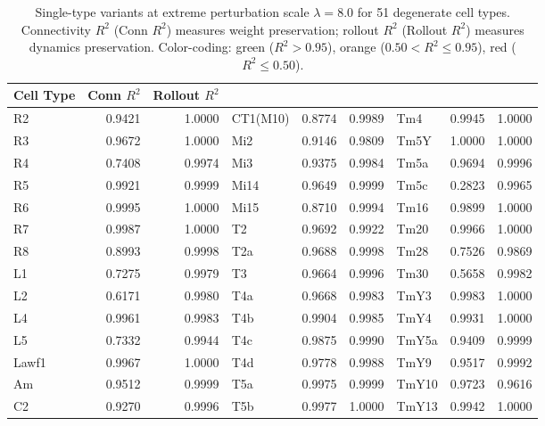 \documentclass[11pt,a4paper]{article}
\begin{document}
\begin{table}[h!]
\centering
\footnotesize
\begin{tabular}{lrr@{\quad}lrr@{\quad}lrr}
\toprule
Cell Type & Conn $R^2$ & Rollout $R^2$ & &  &  &  &  &  \\
\midrule
R2 & \cellcolor{corange} 0.9421 & 1.0000 & CT1(M10) & \cellcolor{corange} 0.8774 & 0.9989 & Tm4 & \cellcolor{cgreen} 0.9945 & 1.0000 \\
R3 & \cellcolor{cgreen} 0.9672 & 1.0000 & Mi2 & \cellcolor{corange} 0.9146 & 0.9809 & Tm5Y & \cellcolor{cgreen} 1.0000 & 1.0000 \\
R4 & \cellcolor{corange} 0.7408 & 0.9974 & Mi3 & \cellcolor{corange} 0.9375 & 0.9984 & Tm5a & \cellcolor{cgreen} 0.9694 & 0.9996 \\
R5 & \cellcolor{cgreen} 0.9921 & 0.9999 & Mi14 & \cellcolor{cgreen} 0.9649 & 0.9999 & Tm5c & \cellcolor{cred} 0.2823 & 0.9965 \\
R6 & \cellcolor{cgreen} 0.9995 & 1.0000 & Mi15 & \cellcolor{corange} 0.8710 & 0.9994 & Tm16 & \cellcolor{cgreen} 0.9899 & 1.0000 \\
R7 & \cellcolor{cgreen} 0.9987 & 1.0000 & T2 & \cellcolor{cgreen} 0.9692 & 0.9922 & Tm20 & \cellcolor{cgreen} 0.9966 & 1.0000 \\
R8 & \cellcolor{corange} 0.8993 & 0.9998 & T2a & \cellcolor{cgreen} 0.9688 & 0.9998 & Tm28 & \cellcolor{corange} 0.7526 & 0.9869 \\
L1 & \cellcolor{corange} 0.7275 & 0.9979 & T3 & \cellcolor{cgreen} 0.9664 & 0.9996 & Tm30 & \cellcolor{corange} 0.5658 & 0.9982 \\
L2 & \cellcolor{corange} 0.6171 & 0.9980 & T4a & \cellcolor{cgreen} 0.9668 & 0.9983 & TmY3 & \cellcolor{cgreen} 0.9983 & 1.0000 \\
L4 & \cellcolor{cgreen} 0.9961 & 0.9983 & T4b & \cellcolor{cgreen} 0.9904 & 0.9985 & TmY4 & \cellcolor{cgreen} 0.9931 & 1.0000 \\
L5 & \cellcolor{corange} 0.7332 & 0.9944 & T4c & \cellcolor{cgreen} 0.9875 & 0.9990 & TmY5a & \cellcolor{corange} 0.9409 & 0.9999 \\
Lawf1 & \cellcolor{cgreen} 0.9967 & 1.0000 & T4d & \cellcolor{cgreen} 0.9778 & 0.9988 & TmY9 & \cellcolor{cgreen} 0.9517 & 0.9992 \\
Am & \cellcolor{cgreen} 0.9512 & 0.9999 & T5a & \cellcolor{cgreen} 0.9975 & 0.9999 & TmY10 & \cellcolor{cgreen} 0.9723 & 0.9616 \\
C2 & \cellcolor{corange} 0.9270 & 0.9996 & T5b & \cellcolor{cgreen} 0.9977 & 1.0000 & TmY13 & \cellcolor{cgreen} 0.9942 & 1.0000 \\
\bottomrule
\end{tabular}
\caption{Single-type variants at extreme perturbation scale $\lambda=8.0$ for 51 degenerate cell types. Connectivity $R^2$ (Conn $R^2$) measures weight preservation; rollout $R^2$ (Rollout $R^2$) measures dynamics preservation. Color-coding: green ($R^2 > 0.95$), orange ($0.50 < R^2 \leq 0.95$), red ($R^2 \leq 0.50$).}
\label{tab:lambda_8}
\end{table}
\end{document}
